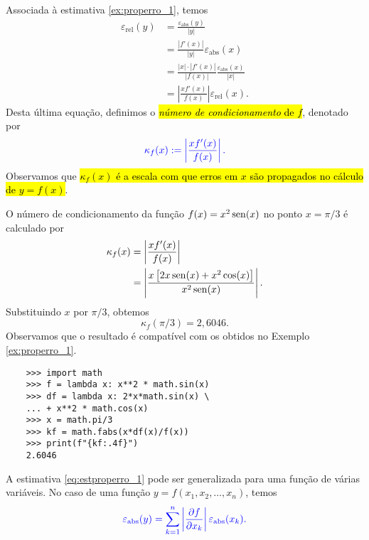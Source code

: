 Associada à estimativa \eqref{ex:properro_1}, temos
\begin{align*}
  \varepsilon_{\text{rel}}(y) &= \frac{\varepsilon_{\text{abs}}(y)}{|y|}\\
  &= \frac{|f'(x)|}{|y|}\varepsilon_{\text{abs}}(x)\\
  &= \frac{|x|\cdot |f'(x)|}{|f(x)|}\frac{\varepsilon_{\text{abs}}(x)}{|x|}\\
  &= \left|\frac{xf'(x)}{f(x)}\right|\varepsilon_{\text{rel}}(x).
\end{align*}
Desta última equação, definimos o \hl{\emph{número de condicionamento} de $f$}, denotado por
\begin{equation}
  \color{blue}\kappa_f(x) := \left|\frac{xf'(x)}{f(x)}\right|.
\end{equation}
Observamos que \hl{$\kappa_f(x)$ é a escala com que erros em $x$ são propagados no cálculo de $y = f(x)$}.

\begin{ex}\label{ex:numcond_1}
  O número de condicionamento da função $f(x) = x^2\operatorname{sen}(x)$ no ponto $x=\pi/3$ é calculado por
  \begin{align}
    \kappa_f(x) &= \left|\frac{xf'(x)}{f(x)}\right|\\
                &= \left|\frac{x\left[2x\operatorname{sen}(x)+x^2\cos(x)\right]}{x^2\operatorname{sen}(x)}\right|. 
  \end{align}
  Substituindo $x$ por $\pi/3$, obtemos
  \begin{equation}
    \kappa_f(\pi/3) = 2,6046.
  \end{equation}
  Observamos que o resultado é compatível com os obtidos no Exemplo \ref{ex:properro_1}.
  
  
  \begin{lstlisting}
    >>> import math
    >>> f = lambda x: x**2 * math.sin(x) 
    >>> df = lambda x: 2*x*math.sin(x) \
    ... + x**2 * math.cos(x)
    >>> x = math.pi/3
    >>> kf = math.fabs(x*df(x)/f(x))
    >>> print(f"{kf:.4f}")
    2.6046
  \end{lstlisting}
  
\end{ex}

A estimativa \eqref{eq:estproperro_1} pode ser generalizada para uma função de várias variáveis. No caso de uma função $y = f(x_1,x_2,\dotsc,x_n)$, temos
\begin{equation}\label{eq:estproperro_n}
  \color{blue}\varepsilon_{\text{abs}}(y) = \sum_{k=1}^n \left|\frac{\partial f}{\partial x_k}\right|\varepsilon_{\text{abs}}(x_k).
\end{equation}

